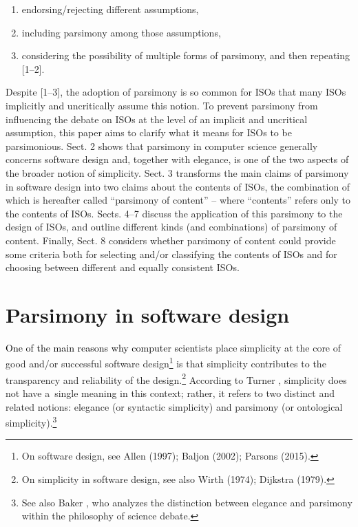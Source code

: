 \begin{enumerate}

\item endorsing/rejecting different assumptions,

\item including parsimony among those assumptions,

\item considering the possibility of multiple forms of parsimony, and then repeating [1–2].

\end{enumerate}

Despite [1–3], the adoption of parsimony is so common for ISOs that many ISOs implicitly and uncritically assume this notion. To prevent parsimony from influencing the debate on ISOs at the level of an implicit and uncritical assumption,\textcolor{red}{ }this paper aims to clarify what it means for ISOs to be parsimonious. Sect. 2 shows that parsimony in computer science generally concerns software design and, together with elegance, is one of the two aspects of the broader notion of simplicity. Sect. 3 transforms the main claims of parsimony in software design into two claims about the contents of ISOs, the combination of which is hereafter called ``parsimony of content'' -- where ``contents'' refers only to the contents of ISOs. Sects. 4–7 discuss the application of this parsimony to the design of ISOs, and outline different kinds (and combinations) of parsimony of content. Finally, Sect. 8 considers whether parsimony of content could provide some criteria both for selecting and/or classifying the contents of ISOs and for choosing between different and equally consistent ISOs.



\section{Parsimony in software design}

\textcolor{black}{One of the main reasons why computer scien}tists place simplicity at the core of good and/or successful software design\footnote{\textrm{ On }\textrm{software design}\textrm{, see Allen }\label{ref:RNDu7LGVjHRhr}\textrm{(1997)}\textrm{; Baljon }\label{ref:RNDjD9j6SQGDR}\textrm{(2002)}\textrm{; Parsons }\label{ref:RNDjLVRqmMj5I}\textrm{(2015)}\textrm{.}} is that simplicity contributes to the transparency and reliability of the design.\footnote{\textrm{ On simplicity in software design, see also Wirth }\label{ref:RND5FbOktAkkg}\textrm{(1974)}\textrm{; Dijkstra }\label{ref:RNDcl3gE1ch0O}\textrm{(1979)}\textrm{.}} According to Turner 
\parencite*[][pp.133–134]{turner_computational_2018}, %
 simplicity does not have a~single meaning in this context; rather, it refers to two distinct and related notions: elegance (or syntactic simplicity) and parsimony (or ontological simplicity).\footnote{See also Baker 
\parencite*[][]{baker_simplicity_2016}, %
 who analyzes the distinction between elegance and parsimony within the philosophy of science debate. }



